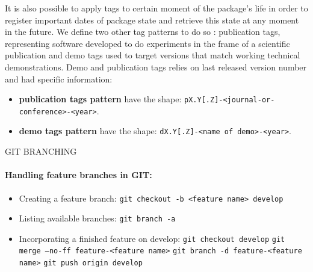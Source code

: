 \documentclass[12pt,a4paper]{article}
\begin{document}
It is also possible to apply tags to certain moment of the package's life in order to register important dates of package state and retrieve this state at any moment in the future. We define two other tag patterns to do so : publication tags, representing software developed to do experiments in the frame of a scientific publication and demo tags used to target versions that match working technical demonstrations. Demo and publication tags relies on last released version number and had specific information:
\begin{itemize}
\item \textbf{publication tags pattern} have the shape: \linebreak \texttt{pX.Y[.Z]-<journal-or-conference>-<year>}.
\item \textbf{demo tags pattern} have the shape:
\linebreak \texttt{dX.Y[.Z]-<name of demo>-<year>}.
\end{itemize}
 
GIT BRANCHING
 
\paragraph{Handling feature branches in GIT:}
\begin{itemize}
\item Creating a feature branch:
\linebreak \texttt{git checkout -b <feature name> develop}
\item Listing available branches:
\linebreak \texttt{git branch -a}
\item Incorporating a finished feature on develop:
\linebreak \texttt{git checkout develop}
\linebreak \texttt{git merge --no-ff feature-<feature name>}
\linebreak \texttt{git branch -d  feature-<feature name>}
\linebreak \texttt{git push origin develop}
\end{itemize}


\pagebreak
\end{document}
